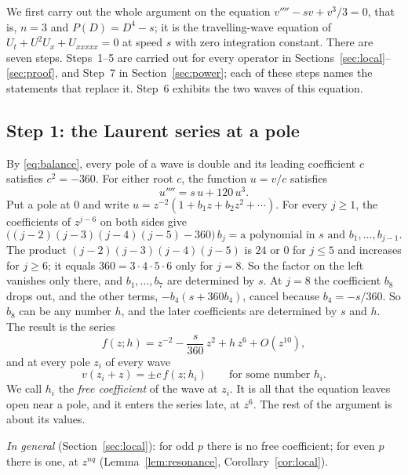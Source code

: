 \documentclass[11pt]{article}
\theoremstyle{definition}
\theoremstyle{remark}
\numberwithin{equation}{section}
\begin{document}
We first carry out the whole argument on the equation
\(v''''-sv+v^3/3=0\), that is, \(n=3\) and \(P(D)=D^4-s\); it is the
travelling-wave equation of \(U_t+U^2U_x+U_{xxxxx}=0\) at speed \(s\)
with zero integration constant. There are seven steps. Steps~1--5
are carried out for every operator in
Sections~\ref{sec:local}--\ref{sec:proof}, and Step~7 in
Section~\ref{sec:power}; each of these steps names the
statements that replace it. Step~6 exhibits the two waves of this
equation.

\subsection{Step 1: the Laurent series at a pole}\label{sec:ex-laurent}

By \eqref{eq:balance}, every pole of a wave is double and its leading
coefficient \(c\) satisfies \(c^2=-360\). For either root \(c\), the
function \(u=v/c\) satisfies
\begin{equation}\label{eq:ex-ode}
 u''''=s\,u+120\,u^3 .
\end{equation}
Put a pole at \(0\) and write \(u=z^{-2}(1+b_1z+b_2z^2+\cdots)\). For
every \(j\ge1\), the coefficients of \(z^{j-6}\) on both sides give
\[
 \bigl((j-2)(j-3)(j-4)(j-5)-360\bigr)\,b_j
 =\text{a polynomial in \(s\) and \(b_1,\dots,b_{j-1}\)} .
\]
The product \((j-2)(j-3)(j-4)(j-5)\) is \(24\) or \(0\) for \(j\le5\)
and increases for \(j\ge6\); it equals \(360=3\cdot4\cdot5\cdot6\) only
for \(j=8\). So the factor on the left vanishes only there, and
\(b_1,\dots,b_7\) are determined by \(s\). At \(j=8\) the
coefficient \(b_8\) drops out, and the other terms,
\(-b_4(s+360b_4)\), cancel because \(b_4=-s/360\). So \(b_8\) can be
any number \(h\), and the later coefficients are determined by \(s\)
and \(h\). The result is the series
\[
 f(z;h)=z^{-2}-\frac{s}{360}\,z^{2}+h\,z^{6}+O(z^{10}),
\]
and at every pole \(z_i\) of every wave
\begin{equation}\label{eq:ex-germs}
 v(z_i+z)=\pm c\,f(z;h_i)\qquad\text{for some number }h_i .
\end{equation}
We call \(h_i\) the \emph{free coefficient} of the wave at \(z_i\). It
is all that the equation leaves open near a pole, and it enters the
series late, at \(z^6\). The rest of the argument is about its values.

\emph{In general} (Section~\ref{sec:local}): for odd \(p\) there is
no free coefficient; for even \(p\) there is one, at \(z^{nq}\)
(Lemma~\ref{lem:resonance}, Corollary~\ref{cor:local}).
\end{document}
